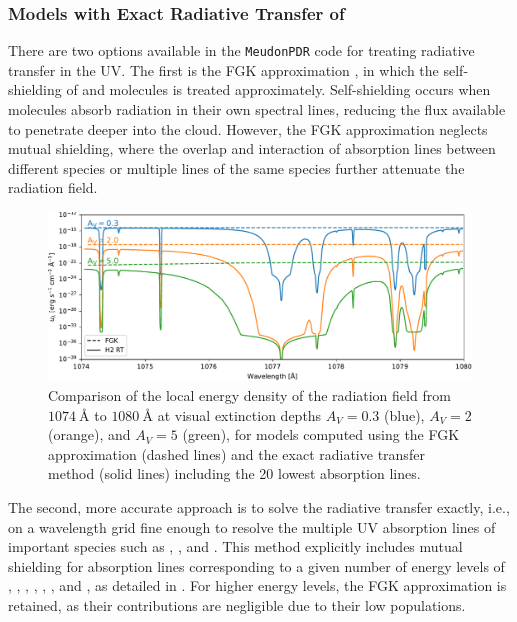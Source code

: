 \documentclass[12pt,a4paper]{article}
\newcommand{\mdpdr}{\texttt{MeudonPDR} code}
\newcommand{\qt}[1]{}
\begin{document}
\subsubsection{Models with Exact Radiative Transfer of \texorpdfstring{}{H2}} \label{sec:exactrt}

There are two options available in the \mdpdr{} for treating radiative transfer in the UV. The first is the FGK approximation \parencite{Federman1979}, in which the self-shielding of  and  molecules is treated approximately. Self-shielding occurs when molecules absorb radiation in their own spectral lines, reducing the flux available to penetrate deeper into the cloud. However, the FGK approximation neglects mutual shielding, where the overlap and interaction of absorption lines between different species or multiple lines of the same species further attenuate the radiation field.

\begin{figure}[h]
    \centering
    \includegraphics[width=.92\textwidth,keepaspectratio]{spectra_fgkh2_1.pdf}
    \caption{Comparison of the local energy density of the radiation field from $1074~\text{\AA}$ to $1080~\text{\AA}$ at visual extinction depths $A_V = 0.3$ (blue), $A_V = 2$ (orange), and $A_V = 5$ (green), for models computed using the FGK approximation (dashed lines) and the exact radiative transfer method (solid lines) including the 20 lowest  absorption lines. \qt{change the plot?}} \label{fig:cmpH2rtspectra}
\end{figure}

The second, more accurate approach is to solve the radiative transfer exactly, i.e., on a wavelength grid fine enough to resolve the multiple UV absorption lines of important species such as , , and . This method explicitly includes mutual shielding for absorption lines corresponding to a given number of energy levels of , , , , , , and , as detailed in \textcite{Goicoechea2007, Gonzalez2008}. For higher energy levels, the FGK approximation is retained, as their contributions are negligible due to their low populations.
\end{document}
